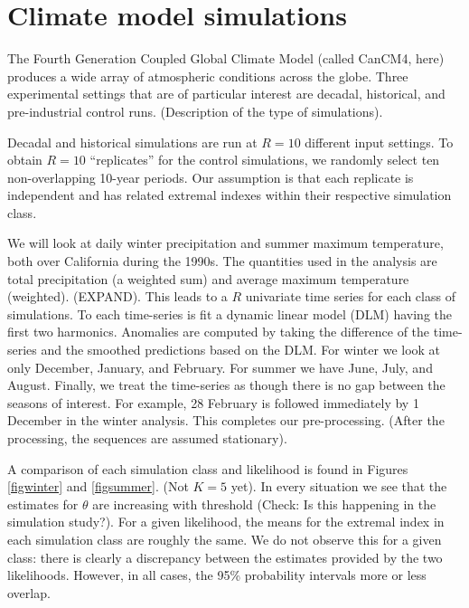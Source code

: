 \section{Climate model simulations}
\label{climate}

The Fourth Generation Coupled Global Climate Model (called CanCM4, here) produces a wide array of atmospheric conditions across the globe. Three experimental settings that are of particular interest are decadal, historical, and pre-industrial control runs. (Description of the type of simulations).

Decadal and historical simulations are run at $R=10$ different input settings. To obtain $R=10$ ``replicates'' for the control simulations, we randomly select ten non-overlapping 10-year periods. Our assumption is that each replicate is independent and has related extremal indexes within their respective simulation class.

We will look at daily winter precipitation and summer maximum temperature, both over California during the 1990s. The quantities used in the analysis are total precipitation (a weighted sum) and average maximum temperature (weighted). (EXPAND). This leads to a $R$ univariate time series for each class of simulations. To each time-series is fit a dynamic linear model (DLM) having the first two harmonics. Anomalies are computed by taking the difference of the time-series and the smoothed predictions based on the DLM. For winter we look at only December, January, and February. For summer we have June, July, and August. Finally, we treat the time-series as though there is no gap between the seasons of interest. For example, 28 February is followed immediately by 1 December in the winter analysis. This completes our pre-processing. (After the processing, the sequences are assumed stationary).

A comparison of each simulation class and likelihood is found in Figures \ref{figwinter} and \ref{figsummer}. (Not $K=5$ yet). In every situation we see that the estimates for $\theta$ are increasing with threshold (Check: Is this happening in the simulation study?). For a given likelihood, the means for the extremal index in each simulation class are roughly the same. We do not observe this for a given class: there is clearly a discrepancy between the estimates provided by the two likelihoods. However, in all cases, the 95\% probability intervals more or less overlap.

